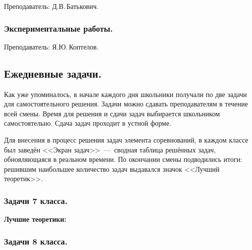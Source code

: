\documentclass[12pt,a4paper,oneside]{scrartcl}
\newcounter{notask}
\newlength{\h}
\newlength{\x}
\begin{document}
\textsf{Преподаватель: Д.В.\,Батькович.}
\smallskip





\setcounter{notask}{1}
\parindent=5mm

\subsubsection{Экспериментальные работы.}
\label{sec:daily_11_exp}

\textsf{Преподаватель: Я.Ю.\,Коптелов.}
\smallskip



\subsection{Ежедневные задачи.}
\label{sec:2-a-day}

Как уже упоминалось, в начале каждого дня школьники получали по две
задачи для самостоятельного решения. Задачи можно сдавать
преподавателям в течение всей смены. Время для решения и сдачи задач
выбирается школьником самостоятельно. Сдача задач проходит в устной
форме.

Для внесения в процесс решения задач элемента соревнований, в каждом
классе был заведён <<Экран задач>>~---~сводная таблица решённых задач,
обновляющаяся в реальном времени. По окончании смены подводились
итоги: решившим наибольшее количество задач выдавался значок <<Лучший
теоретик>>. 

\subsubsection{Задачи 7 класса.}
\label{sec:2-a-day_7}

\setcounter{notask}{1}
\vspace{1cm}

\begin{center}
\textbf{Лучшие теоретики:}
\end{center}

\begin{figure}[h]
  \centering
  \hspace{0.05\textwidth}
\end{figure}

\subsubsection{Задачи 8 класса.}
\label{sec:2-a-day_8}

\setcounter{notask}{1}
\vspace{1cm}
\end{document}
